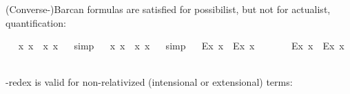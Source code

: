\begin{isabellebody}
\begin{isamarkuptext}
(Converse-)Barcan formulas are satisfied for possibilist, but not for actualist, quantification:%
\end{isamarkuptext}\isamarkuptrue%
\ \isamarkupfalse%
\ {\isachardoublequoteopen}{\isasymlfloor}{\isacharparenleft}\isactrlbold {\isasymforall}x{\isachardot}\isactrlbold {\isasymbox}{\isacharparenleft}{\isasymphi}\ x{\isacharparenright}{\isacharparenright}\ \isactrlbold {\isasymrightarrow}\ \isactrlbold {\isasymbox}{\isacharparenleft}\isactrlbold {\isasymforall}x{\isachardot}{\isacharparenleft}{\isasymphi}\ x{\isacharparenright}{\isacharparenright}{\isasymrfloor}{\isachardoublequoteclose}%
\ %
%
\isamarkupfalse%
\ simp%
%
%
\isanewline
\ \isamarkupfalse%
\ {\isachardoublequoteopen}{\isasymlfloor}\isactrlbold {\isasymbox}{\isacharparenleft}\isactrlbold {\isasymforall}x{\isachardot}{\isacharparenleft}{\isasymphi}\ x{\isacharparenright}{\isacharparenright}\ \isactrlbold {\isasymrightarrow}\ {\isacharparenleft}\isactrlbold {\isasymforall}x{\isachardot}\isactrlbold {\isasymbox}{\isacharparenleft}{\isasymphi}\ x{\isacharparenright}{\isacharparenright}{\isasymrfloor}{\isachardoublequoteclose}%
\ %
%
\isamarkupfalse%
\ simp%
%
%
\isanewline
\ \isamarkupfalse%
\ {\isachardoublequoteopen}{\isasymlfloor}{\isacharparenleft}\isactrlbold {\isasymforall}\isactrlsup Ex{\isachardot}\isactrlbold {\isasymbox}{\isacharparenleft}{\isasymphi}\ x{\isacharparenright}{\isacharparenright}\ \isactrlbold {\isasymrightarrow}\ \isactrlbold {\isasymbox}{\isacharparenleft}\isactrlbold {\isasymforall}\isactrlsup Ex{\isachardot}{\isacharparenleft}{\isasymphi}\ x{\isacharparenright}{\isacharparenright}{\isasymrfloor}{\isachardoublequoteclose}\ \isamarkupfalse%
%
\ %
%
\isamarkupfalse%
\ %
%
%
%
\isanewline
\ \isamarkupfalse%
\ {\isachardoublequoteopen}{\isasymlfloor}\isactrlbold {\isasymbox}{\isacharparenleft}\isactrlbold {\isasymforall}\isactrlsup Ex{\isachardot}{\isacharparenleft}{\isasymphi}\ x{\isacharparenright}{\isacharparenright}\ \isactrlbold {\isasymrightarrow}\ {\isacharparenleft}\isactrlbold {\isasymforall}\isactrlsup Ex{\isachardot}\isactrlbold {\isasymbox}{\isacharparenleft}{\isasymphi}\ x{\isacharparenright}{\isacharparenright}{\isasymrfloor}{\isachardoublequoteclose}\ \isamarkupfalse%
%
\ %
%
\isamarkupfalse%
\ %
%
%
%
%
\begin{isamarkuptext}%
\isa{{\isasymbeta}{\isasymeta}}-redex is valid for non-relativized (intensional or extensional) terms:%

\end{isamarkuptext}
\end{isabellebody}
